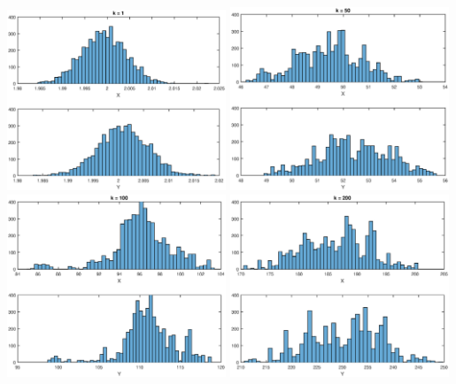 \documentclass[english,DIV=13]{scrreprt}
\begin{document}
\begin{center}
   \includegraphics[width=0.49\textwidth]{img/q3_hist_1.eps}
   \includegraphics[width=0.49\textwidth]{img/q3_hist_50.eps}
   \includegraphics[width=0.49\textwidth]{img/q3_hist_100.eps}
   \includegraphics[width=0.49\textwidth]{img/q3_hist_200.eps}
\end{center}
\end{document}
